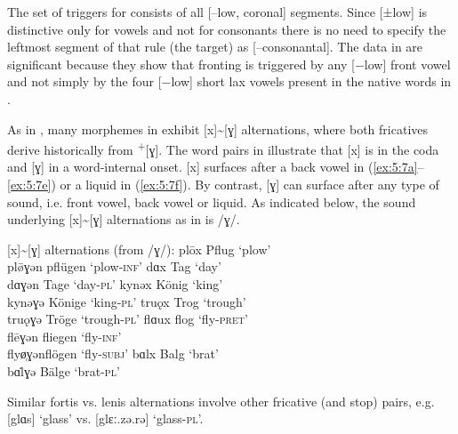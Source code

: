 The set of triggers for  consists of all [--low, coronal] segments. Since [±low] is distinctive only for vowels and not for consonants there is no need to specify the leftmost segment of that rule (the target) as [--consonantal]. The  data in  are significant because they show that fronting is triggered by any [−low] front vowel and not simply by the four [−low] short lax vowels present in the native words in .

As in , many morphemes in  exhibit [x]{\textasciitilde}[ɣ] alternations, where both fricatives derive historically from   \textsuperscript{+}[ɣ]. The word pairs in  illustrate that [x] is in the coda and [ɣ] in a word-internal onset. [x] surfaces after a back vowel in (\ref{ex:5:7a}--\ref{ex:5:7e}) or a liquid in (\ref{ex:5:7f}). By contrast, [ɣ] can surface after any type of sound, i.e. front vowel, back vowel or liquid. As indicated below, the sound underlying [x]{\textasciitilde}[ɣ] alternations as in  is /ɣ/.

\ea%
\label{ex:5:7}
   [x]{\textasciitilde}[ɣ] alternations (from /ɣ/): 
\ea\label{ex:5:7a} plōx       \tab  [ploːx]    \tab Pflug   \tab ‘plow’              \\
    pl\={ø}ɣən  \tab pflügen \tab ‘plow-\textsc{inf}’ 
\ex\label{ex:5:7b} 
dɑx   \tab  [dɑx]    \tab Tag  \tab ‘day’  \\
dɑɣən \tab  [dɑ.ɣən] \tab Tage \tab ‘day-\textsc{pl}’ 
\ex\label{ex:5:7c}
kynəx  \tab [ky.nəx]   \tab König  \tab ‘king’   \\
kynəɣə \tab [ky.nə.ɣə] \tab Könige \tab  ‘king-\textsc{pl}’ 
\ex\label{ex:5:7d}
truǫx   \tab [truɔx]   \tab Trog  \tab ‘trough’   \\
truǫɣə  \tab [truɔ.ɣə] \tab Tröge \tab  ‘trough-\textsc{pl}’ 
\ex\label{ex:5:7e}
flɑux   \tab [flɑux]    \tab flog    \tab ‘fly\textsc{{}-pret}’ \\
flēɣən   \tab fliegen \tab ‘fly-\textsc{inf}’     \\
flyø̜ɣən\tab  flögen \tab  ‘fly-\textsc{subj}’   
\ex\label{ex:5:7f}
bɑlx   \tab [bɑlx]   \tab Balg  \tab ‘brat’  \\
bɑ̇lɣə  \tab [bæl.ɣə] \tab Bälge \tab ‘brat-\textsc{pl}’ 
 \z
\z 

Similar fortis vs. lenis alternations involve other fricative (and stop) pairs, e.g. [glɑs] ‘glass’ vs. [glɛː.zə.rə] ‘glass-\textsc{pl}’.

